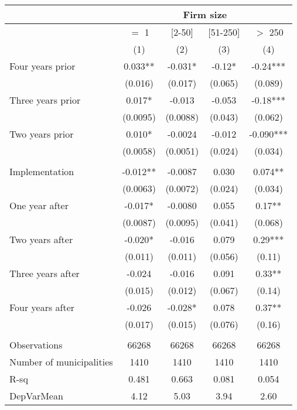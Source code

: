\begin{tabular}{lcccc}
\toprule
      & \multicolumn{4}{c}{Firm size} \\
\midrule
      & $=$ 1 & [2-50] & [51-250] & $>$ 250 \\
\midrule
      & (1)   & (2)   & (3)   & (4) \\
\midrule
\midrule
Four years prior & 0.033** & -0.031* & -0.12* & -0.24*** \\
      & (0.016) & (0.017) & (0.065) & (0.089) \\
Three years prior & 0.017* & -0.013 & -0.053 & -0.18*** \\
      & (0.0095) & (0.0088) & (0.043) & (0.062) \\
Two years prior & 0.010* & -0.0024 & -0.012 & -0.090*** \\
      & (0.0058) & (0.0051) & (0.024) & (0.034) \\
      &       &       &       &  \\
Implementation & -0.012** & -0.0087 & 0.030 & 0.074** \\
      & (0.0063) & (0.0072) & (0.024) & (0.034) \\
One year after & -0.017* & -0.0080 & 0.055 & 0.17** \\
      & (0.0087) & (0.0095) & (0.041) & (0.068) \\
Two years after & -0.020* & -0.016 & 0.079 & 0.29*** \\
      & (0.011) & (0.011) & (0.056) & (0.11) \\
Three years after & -0.024 & -0.016 & 0.091 & 0.33** \\
      & (0.015) & (0.012) & (0.067) & (0.14) \\
Four years after & -0.026 & -0.028* & 0.078 & 0.37** \\
      & (0.017) & (0.015) & (0.076) & (0.16) \\
      &       &       &       &  \\
\midrule
Observations & 66268 & 66268 & 66268 & 66268 \\
Number of municipalities & 1410  & 1410  & 1410  & 1410 \\
R-sq  & 0.481 & 0.663 & 0.081 & 0.054 \\
DepVarMean & 4.12  & 5.03  & 3.94  & 2.60 \\
\bottomrule
\bottomrule
\end{tabular}%
